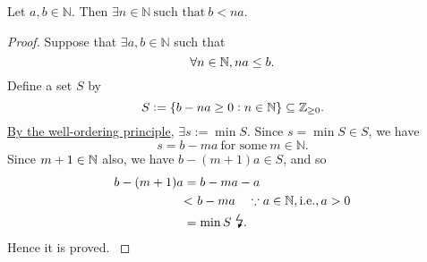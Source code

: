 \documentclass[11pt,openany]{article}
\begin{document}
\vfill
\begin{note}
	Let $a,b\in\mathbb{N}$. Then $
	\exists n\in\mathbb{N}\ \text{such that}\ b< na$.
%		
%		
%		
%		
%		
	\begin{proof}
	\textcolor{gray!50}{Suppose that $
	\exists a,b\in\mathbb{N}$ such that \[
	\forall n\in\mathbb{N}, na\leq b.
	\] Define a set $S$ by \[
	S:=\set{b-na\geq 0:n\in\mathbb{N}}\subseteq\mathbb{Z}_{\geq 0}.
	\] \underline{By the well-ordering principle}, $\exists s:=\min S$. Since $s=\min S\in S$, we have\[
	s=b-ma\ \text{for some}\ m\in\mathbb{N}.
	\] Since $m+1\in\mathbb{N}$ also, we have  $b-(m+1)a\in S$, and so \begin{align*}
		{b-(m+1)a}&=b-ma-a\\
		& {<}\ b-ma\quad\because a\in\mathbb{N}, \textnormal{i.e.}, a > 0\\
		& ={\min S}\ \text{\Large\lightning}.
	\end{align*} Hence it is proved. }
	\end{proof}	
\end{note}
\end{document}
